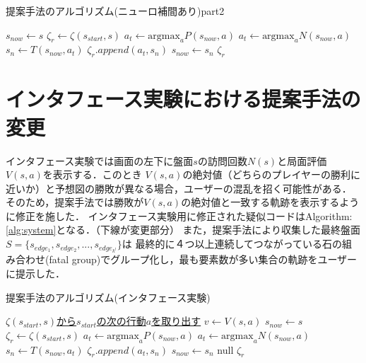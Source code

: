 \begin{algorithm}
    \caption{提案手法のアルゴリズム(ニューロ補間あり)part2}
    \label{alg:neuro-2}
    \begin{algorithmic}[1] 
        \State $s_{now} \gets s$
        \State $\zeta_r \gets \zeta(s_{start}, s)$
                \State \underline{$a_t \gets \textrm{argmax}_a P(s_{now}, a)$}
            \Else
                \State $a_t \gets \textrm{argmax}_a N(s_{now}, a)$
            \EndIf
            \State $s_n \gets T(s_{now}, a_t)$
            \State $\zeta_r.append({a_t, s_n})$
            \State $s_{now} \gets s_n$
        \EndWhile
        \Return $\zeta_r$
        \EndFunction
       
        
    \end{algorithmic}
\end{algorithm}
\section{インタフェース実験における提案手法の変更}
\label{sec:fix}
インタフェース実験では画面の左下に盤面$s$の訪問回数$N(s)$と局面評価$V(s, a)$を表示する．このとき
$V(s, a)$の絶対値（どちらのプレイヤーの勝利に近いか）と予想図の勝敗が異なる場合，ユーザーの混乱を招く可能性がある．
そのため，提案手法では勝敗が$V(s, a)$の絶対値と一致する軌跡を表示するように修正を施した．
インタフェース実験用に修正された疑似コードはAlgorithm:\ref{alg:system}となる．（下線が変更部分）
また，提案手法により収集した最終盤面$S=\{s_{edge_1}, s_{edge_2}, ..., s_{edge_{k^l}}\}$は
最終的に４つ以上連続してつながっている石の組み合わせ(fatal group)でグループ化し，最も要素数が多い集合の軌跡をユーザーに提示した．

\begin{algorithm}
    \caption{提案手法のアルゴリズム(インタフェース実験)}
    \label{alg:system}
    \begin{algorithmic}[1]       
        
        \State  \underline{$\zeta(s_{start}, s)$から$s_{start}$の次の行動$a$を取り出す}
        \State \underline{$v \gets V(s, a)$}
        \State $s_{now} \gets s$
        \State $\zeta_r \gets \zeta(s_{start}, s)$
                \State \underline{$a_t \gets \textrm{argmax}_a P(s_{now}, a)$}
            \Else
                \State $a_t \gets \textrm{argmax}_a N(s_{now}, a)$
            \EndIf
            \State $s_n \gets T(s_{now}, a_t)$
            \State $\zeta_r.append({a_t, s_n})$
            \State $s_{now} \gets s_n$
        \EndWhile
           \Return null
        \EndIf
        \Return $\zeta_r$
        \EndFunction
       
        
    \end{algorithmic}
\end{algorithm}
